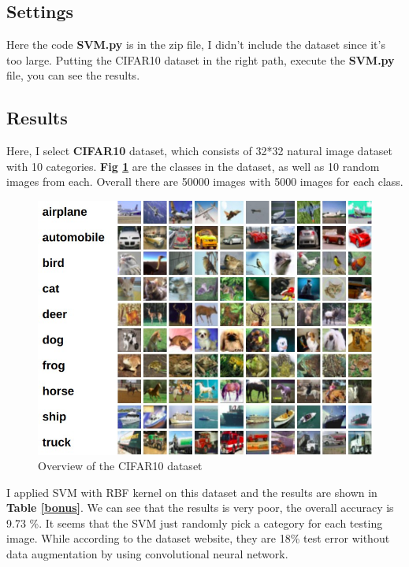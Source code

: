 \documentclass{article}
\theoremstyle{definition}
\numberwithin{equation}{section}
\numberwithin{figure}{section}
\begin{document}
\subsection{Settings}
Here the code \textbf{SVM.py} is in the zip file, I didn't include the dataset since it's too large. Putting the CIFAR10 dataset in the right path, execute the \textbf{SVM.py} file, you can see the results.
\subsection{Results}
Here, I select \textbf{CIFAR10} dataset, which consists of 32*32 natural image dataset with 10 categories. \textbf{Fig \ref{CIFAR}} are the classes in the dataset, as well as 10 random images from each. Overall there are 50000 images with 5000 images for each class. 
\begin{figure}[htbp]
  	\centering
  	\includegraphics[width=12cm]{fig/CIFAR.jpg}
  \caption{Overview of the CIFAR10 dataset}
  \label{CIFAR}
  \end{figure}
I applied SVM with RBF kernel on this dataset and the results are shown in \textbf{Table \ref{bonus}}. We can see that the results is very poor, the overall accuracy is 9.73 \%.  It seems that the SVM just randomly pick a category for each testing image. While according to the dataset website, they are 18\% test error without data augmentation by using convolutional neural network.

  
  
\end{document}
